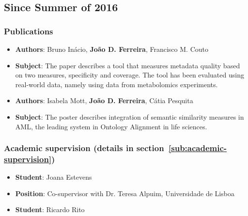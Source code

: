 \subsection*{Since Summer of 2016}

\subsubsection{Publications}

\begin{itemize}
    \item \textbf{Authors}: Bruno Inácio, \textbf{João D. Ferreira}, Francisco M. Couto
    \item \textbf{Subject}: The paper describes a tool that measures metadata quality based on two measures, specificity and coverage. The tool has been evaluated using real-world data, namely using data from metabolomics experiments.
\end{itemize}

\begin{itemize}
    \item \textbf{Authors}: Isabela Mott, \textbf{João D. Ferreira}, Cátia Pesquita
    \item \textbf{Subject}: The poster describes integration of semantic similarity measures in AML, the leading system in Ontology Alignment in life sciences.
\end{itemize}


\subsubsection{Academic supervision (details in section~\ref{sub:academic-supervision})}

\begin{itemize}
    \item \textbf{Student}: Joana Estevens
    \item \textbf{Position}: Co-supervisor with Dr. Teresa Alpuim, Universidade de Lisboa
\end{itemize}


\begin{itemize}
    \item \textbf{Student}: Ricardo Rito
\end{itemize}


